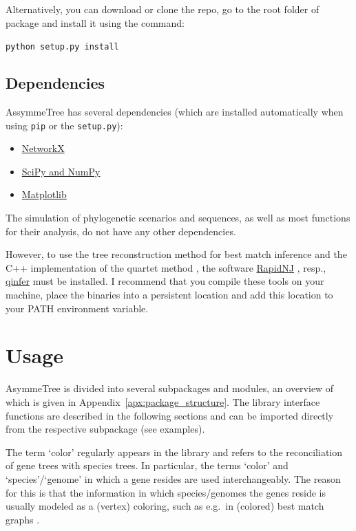 \documentclass[hidelinks,11pt]{article}
\newcommand{\COMMANDLINE}[1]{\begingroup\par\vspace{3mm}\color{darkgrey}\begin{adjustwidth}{1cm}{1cm}\texttt{#1}\end{adjustwidth}\vspace{3mm}\endgroup}
\begin{document}
Alternatively, you can download or clone the repo, go to the root folder of package and install it using the command:

\COMMANDLINE{python setup.py install}


\subsection{Dependencies}

AssymmeTree has several dependencies (which are installed automatically when using \texttt{pip} or the \texttt{setup.py}):

\begin{itemize}
	\item \href{https://networkx.github.io}{NetworkX}
	\item \href{http://www.scipy.org/install.html}{SciPy and NumPy}
	\item \href{https://matplotlib.org/}{Matplotlib}
\end{itemize}

The simulation of phylogenetic scenarios and sequences, as well as most 
functions for their analysis, do not have any other dependencies.

However,
to use the tree reconstruction method for best match inference and the C++ 
implementation of the quartet method \citep{stadler2020}, the software 
\href{https://birc.au.dk/software/rapidnj/}{RapidNJ} \citep{simonsen2008}, 
resp., \href{https://github.com/david-schaller/qinfer}{qinfer} must be 
installed.
I recommend that you compile these tools on your machine, place the binaries 
into a persistent location and add this location to your PATH environment 
variable.



\section{Usage}

AsymmeTree is divided into several subpackages and modules, an overview of which is given in Appendix~\ref{apx:package_structure}.
The library interface functions are described in the following sections and can be imported directly from the respective subpackage (see examples).

The term `color' regularly appears in the library and refers to the reconciliation of gene trees with species trees.
In particular, the terms `color' and `species'/`genome' in which a gene resides are used interchangeably.
The reason for this is that the information in which species/genomes the genes 
reside is usually modeled as a (vertex) coloring, such as e.g.\ in (colored) 
best match graphs \citep{geiss2019a}.
\end{document}
